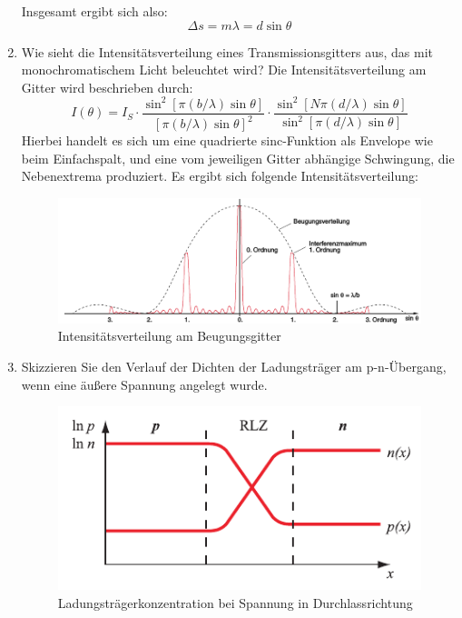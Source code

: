 \begin{enumerate}
		Insgesamt ergibt sich also:
		\begin{displaymath}
			\Delta s=m\lambda=d\sin\theta
		\end{displaymath}
	\pagebreak
	\item Wie sieht die Intensitätsverteilung eines Transmissionsgitters aus, das mit monochromatischem Licht beleuchtet wird?
		\subitem Die Intensitätsverteilung am Gitter wird beschrieben durch:
		\begin{displaymath}
			I(\theta)=I_S\cdot\frac{\sin^2[\pi(b/\lambda)\sin\theta]}{[\pi(b/\lambda)\sin\theta]^2}\cdot\frac{\sin^2[N\pi(d/\lambda)\sin\theta]}{\sin^2[\pi(d/\lambda)\sin\theta]}
		\end{displaymath}
		Hierbei handelt es sich um eine quadrierte sinc-Funktion als Envelope wie beim Einfachspalt, und eine vom jeweiligen Gitter abhängige Schwingung, die Nebenextrema produziert. Es ergibt sich folgende Intensitätsverteilung:
		\begin{figure}[!h]
			\centering
			\includegraphics[]{intensitaet}
			\caption{Intensitätsverteilung am Beugungsgitter}
			\label{fig:Abb2}
		\end{figure}
	\item Skizzieren Sie den Verlauf der Dichten der Ladungsträger am p-n-Übergang, wenn eine äußere Spannung angelegt wurde.
		\subitem \begin{figure}[!h]
			\centering
			\includegraphics[]{pn}
			\caption{Ladungsträgerkonzentration bei Spannung in Durchlassrichtung}
			\label{fig:Abb3}
		\end{figure}
\end{enumerate}

